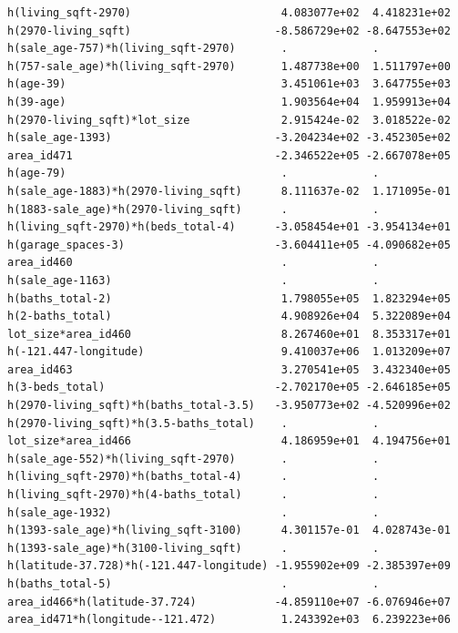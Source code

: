 \documentclass[
]{article}
\begin{document}
\begin{verbatim}
h(living_sqft-2970)                       4.083077e+02  4.418231e+02
h(2970-living_sqft)                      -8.586729e+02 -8.647553e+02
h(sale_age-757)*h(living_sqft-2970)       .             .           
h(757-sale_age)*h(living_sqft-2970)       1.487738e+00  1.511797e+00
h(age-39)                                 3.451061e+03  3.647755e+03
h(39-age)                                 1.903564e+04  1.959913e+04
h(2970-living_sqft)*lot_size              2.915424e-02  3.018522e-02
h(sale_age-1393)                         -3.204234e+02 -3.452305e+02
area_id471                               -2.346522e+05 -2.667078e+05
h(age-79)                                 .             .           
h(sale_age-1883)*h(2970-living_sqft)      8.111637e-02  1.171095e-01
h(1883-sale_age)*h(2970-living_sqft)      .             .           
h(living_sqft-2970)*h(beds_total-4)      -3.058454e+01 -3.954134e+01
h(garage_spaces-3)                       -3.604411e+05 -4.090682e+05
area_id460                                .             .           
h(sale_age-1163)                          .             .           
h(baths_total-2)                          1.798055e+05  1.823294e+05
h(2-baths_total)                          4.908926e+04  5.322089e+04
lot_size*area_id460                       8.267460e+01  8.353317e+01
h(-121.447-longitude)                     9.410037e+06  1.013209e+07
area_id463                                3.270541e+05  3.432340e+05
h(3-beds_total)                          -2.702170e+05 -2.646185e+05
h(2970-living_sqft)*h(baths_total-3.5)   -3.950773e+02 -4.520996e+02
h(2970-living_sqft)*h(3.5-baths_total)    .             .           
lot_size*area_id466                       4.186959e+01  4.194756e+01
h(sale_age-552)*h(living_sqft-2970)       .             .           
h(living_sqft-2970)*h(baths_total-4)      .             .           
h(living_sqft-2970)*h(4-baths_total)      .             .           
h(sale_age-1932)                          .             .           
h(1393-sale_age)*h(living_sqft-3100)      4.301157e-01  4.028743e-01
h(1393-sale_age)*h(3100-living_sqft)      .             .           
h(latitude-37.728)*h(-121.447-longitude) -1.955902e+09 -2.385397e+09
h(baths_total-5)                          .             .           
area_id466*h(latitude-37.724)            -4.859110e+07 -6.076946e+07
area_id471*h(longitude--121.472)          1.243392e+03  6.239223e+06
                                                                    

\end{verbatim}
\end{document}
